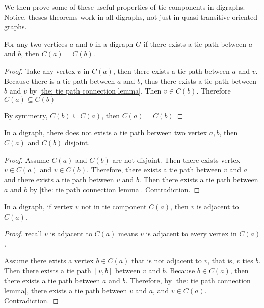 We then prove some of these useful properties
of tie components in digraphs.
Notice, theses theorems work in all digraphs,
not just in quasi-transitive oriented graphs.

\begin{lemma}\label{the: component equal if tie path}
  For any two vertices \(a\) and \(b\) in a digraph \(G\)
  if there exists a tie path between \(a\) and \(b\),
  then \(C(a) = C(b)\).
\end{lemma}

\begin{proof}
  Take any vertex \(v\) in \(C(a)\),
  then there exists a tie path between \(a\) and \(v\).
  Because there is a tie path between \(a\) and \(b\),
  thus there exists a tie path between \(b\) and \(v\)
  by \cref{the: tie path connection lemma}.
  Then \(v \in C(b)\). Therefore \(C(a) \subseteq C(b)\)

  By symmetry, \(C(b) \subseteq C(a)\), then \(C(a) = C(b)\)
\end{proof}

\begin{lemma}\label{the: component disjoint if no tie path}
  In a digraph, there does not exists a tie path between
  two vertex \(a, b\), then \(C(a)\) and \(C(b)\) disjoint.
\end{lemma}
\begin{proof}
  Assume \(C(a)\) and \(C(b)\) are not disjoint.
  Then there exists vertex \(v \in C(a)\) and \(v \in C(b)\).
  Therefore, there exists a tie path between \(v\) and \(a\)
  and there exists a tie path between \(v\) and \(b\).
  Then there exists a tie path between \(a\) and \(b\)
  by \cref{the: tie path connection lemma}.
  Contradiction.
\end{proof}

\begin{lemma}\label{the: adjacent if not in component}
  In a digraph, if vertex \(v\) not in tie component \(C(a)\),
  then \(v\) is adjacent to \(C(a)\).
\end{lemma}
\begin{proof}
  recall \(v\) is adjacent to \(C(a)\)
  means \(v\) is adjacent to every vertex in \(C(a)\).

  Assume there exists a vertex \(b \in C(a)\)
  that is not adjacent to \(v\),
  that is, \(v\) ties \(b\).
  Then there exists a tie path \([v, b]\) between \(v\) and \(b\).
  Because \(b \in C(a)\),
  then there exists a tie path between \(a\) and \(b\).
  Therefore, by \cref{the: tie path connection lemma},
  there exists a tie path between \(v\) and \(a\),
  and \(v \in C(a)\).
  Contradiction.
\end{proof}


